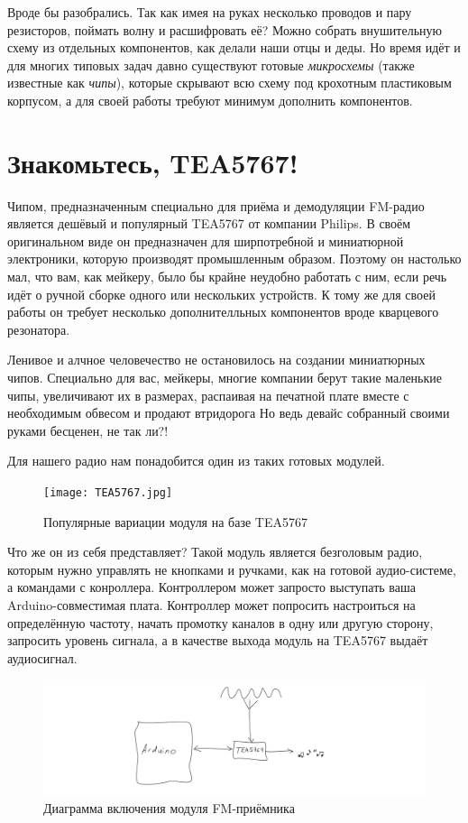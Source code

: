 Вроде бы разобрались. Так как имея на руках несколько проводов и пару резисторов, поймать волну и расшифровать её? Можно собрать внушительную схему из отдельных компонентов, как делали наши отцы и деды. Но время идёт и для многих типовых задач давно существуют готовые \emph{микросхемы} (также известные как \emph{чипы}), которые скрывают всю схему под крохотным пластиковым корпусом, а для своей работы требуют минимум дополнить компонентов.

\section{Знакомьтесь, TEA5767!}

Чипом, предназначенным специально для приёма и демодуляции FM-радио является дешёвый и популярный TEA5767 от компании Philips. В своём оригинальном виде он предназначен для ширпотребной и миниатюрной электроники, которую производят промышленным образом. Поэтому он настолько мал, что вам, как мейкеру, было бы крайне неудобно работать с ним, если речь идёт о ручной сборке одного или нескольких устройств. К тому же для своей работы он требует несколько дополнителльных компонентов вроде кварцевого резонатора.

Ленивое и алчное человечество не остановилось на создании миниатюрных чипов. Специально для вас, мейкеры, многие компании берут такие маленькие чипы, увеличивают их в размерах, распаивая на печатной плате вместе с необходимым обвесом и продают втридорога  Но ведь девайс собранный своими руками бесценен, не так ли?!

Для нашего радио нам понадобится один из таких готовых модулей.

\begin{figure}
  \centering
  \texttt{[image: TEA5767.jpg]}
  \caption{Популярные вариации модуля на базе TEA5767}
\end{figure}

Что же он из себя представляет? Такой модуль является безголовым радио, которым нужно управлять не кнопками и ручками, как на готовой аудио-системе, а командами с конроллера. Контроллером может запросто выступать ваша Arduino-совместимая плата. Контроллер может попросить настроиться на определённую частоту, начать промотку каналов в одну или другую сторону, запросить уровень сигнала, а в качестве выхода модуль на TEA5767 выдаёт аудиосигнал.

\begin{figure}
  \centering
  \includegraphics{sketches/fm-receiver-diagram}
  \caption{Диаграмма включения модуля FM-приёмника}
\end{figure}

